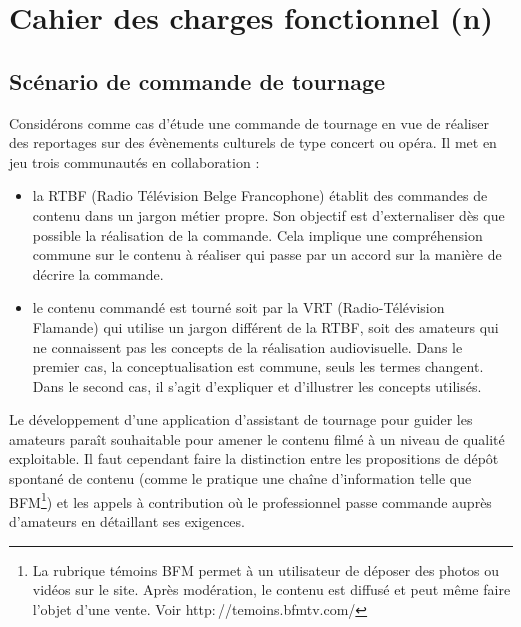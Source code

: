 



\section{Cahier des charges fonctionnel (n)}\label{sec:cdcf}


\subsection{Scénario de commande de tournage}\label{sec:scenar}
Considérons comme cas d'étude une commande de tournage en vue de réaliser des reportages sur des évènements culturels de type concert ou opéra. 
Il met en jeu trois communautés en collaboration :

\begin{itemize}
	\item la RTBF (Radio Télévision Belge Francophone) établit des commandes de contenu dans un jargon métier propre. Son objectif est d'externaliser dès que possible la réalisation de la commande. Cela implique une compréhension commune sur le contenu à réaliser qui passe par un accord sur la manière de décrire la commande. 
	
	\item le contenu commandé est tourné soit par la VRT (Radio-Télévision Flamande) qui utilise un jargon différent de la RTBF, soit des amateurs qui ne connaissent pas les concepts de la réalisation audiovisuelle. Dans le premier cas, la conceptualisation est commune, seuls les termes changent. Dans le second cas, il s'agit d'expliquer et d'illustrer les concepts utilisés.\\
\end{itemize}

Le développement d'une application d'assistant de tournage pour guider les amateurs paraît souhaitable pour amener le contenu filmé à un niveau de qualité exploitable. 
Il faut cependant faire la distinction entre les propositions de dépôt spontané de contenu (comme le pratique une chaîne d'information telle que BFM\footnote{La rubrique témoins BFM permet à un utilisateur de déposer des photos ou vidéos sur le site. 
Après modération, le contenu est diffusé et peut même faire l'objet d'une vente. Voir http$:$//temoins.bfmtv.com/}) et les appels à contribution où le professionnel passe commande auprès d'amateurs en détaillant ses exigences. 

